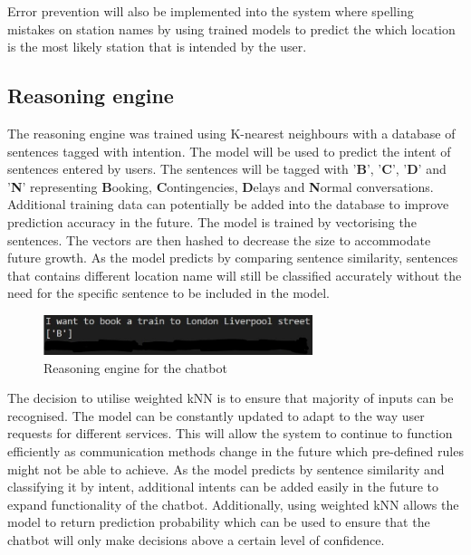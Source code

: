 \documentclass[11pt]{article}
\begin{document}
Error prevention will also be implemented into the system where spelling mistakes on station names by using trained models to predict the which location is the most likely station that is intended by the user.

\subsection{Reasoning engine}
The reasoning engine was trained using K-nearest neighbours with a database of sentences tagged with intention. The model will be used to predict the intent of sentences entered by users. The sentences will be tagged with '\textbf{B}', '\textbf{C}', '\textbf{D}' and '\textbf{N}' representing \textbf{B}ooking, \textbf{C}ontingencies, \textbf{D}elays and \textbf{N}ormal conversations. Additional training data can potentially be added into the database to improve prediction accuracy in the future. The model is trained by vectorising the sentences. The vectors are then hashed to decrease the size to accommodate future growth. As the model predicts by comparing sentence similarity, sentences that contains different location name will still be classified accurately without the need for the specific sentence to be included in the model.

\begin{figure}[!htb]
	\centering
	\includegraphics[width=0.7\textwidth]{Reasoning_Prototype}
	\caption{Reasoning engine for the chatbot }\label{fig:Reasoning_Prototype}
\end{figure}

The decision to utilise weighted kNN is to ensure that majority of inputs can be recognised. The model can be constantly updated to adapt to the way user requests for different services. This will allow the system to continue to function efficiently as communication methods change in the future which pre-defined rules might not be able to achieve. As the model predicts by sentence similarity and classifying it by intent, additional intents can be added easily in the future to expand functionality of the chatbot. Additionally, using weighted kNN allows the model to return prediction probability which can be used to ensure that the chatbot will only make decisions above a certain level of confidence.
\end{document}
